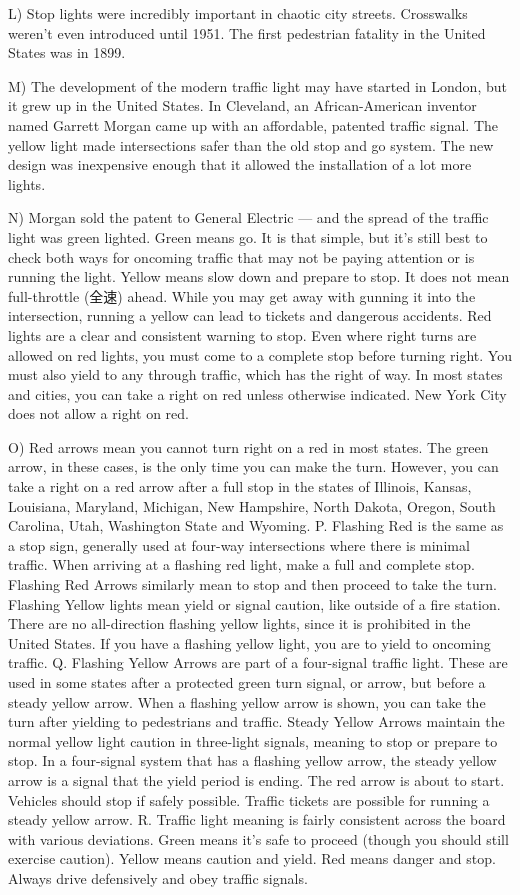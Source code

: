 \documentclass[UTF8,11pt]{ctexart}
\begin{document}
L) Stop lights were incredibly important in chaotic city streets. Crosswalks weren’t even introduced until 1951. The first pedestrian fatality in the United States was in 1899.


M) The development of the modern traffic light may have started in London, but it grew up in the United States. In Cleveland, an African-American inventor named Garrett Morgan came up with an affordable, patented traffic signal. The yellow light made intersections safer than the old stop and go system. The new design was inexpensive enough that it allowed the installation of a lot more lights.


N) Morgan sold the patent to General Electric — and the spread of the traffic light was green lighted. Green means go. It is that simple, but it’s still best to check both ways for oncoming traffic that may not be paying attention or is running the light. Yellow means slow down and prepare to stop. It does not mean full-throttle (全速) ahead. While you may get away with gunning it into the intersection, running a yellow can lead to tickets and dangerous accidents. Red lights are a clear and consistent warning to stop. Even where right turns are allowed on red lights, you must come to a complete stop before turning right. You must also yield to any through traffic, which has the right of way. In most states and cities, you can take a right on red unless otherwise indicated. New York City does not allow a right on red.


O) Red arrows mean you cannot turn right on a red in most states. The green arrow, in these cases, is the only time you can make the turn. However, you can take a right on a red arrow after a full stop in the states of Illinois, Kansas, Louisiana, Maryland, Michigan, New Hampshire, North Dakota, Oregon, South Carolina, Utah, Washington State and Wyoming. P. Flashing Red is the same as a stop sign, generally used at four-way intersections where there is minimal traffic. When arriving at a flashing red light, make a full and complete stop. Flashing Red Arrows similarly mean to stop and then proceed to take the turn. Flashing Yellow lights mean yield or signal caution, like outside of a fire station. There are no all-direction flashing yellow lights, since it is prohibited in the United States. If you have a flashing yellow light, you are to yield to oncoming traffic. Q. Flashing Yellow Arrows are part of a four-signal traffic light. These are used in some states after a protected green turn signal, or arrow, but before a steady yellow arrow. When a flashing yellow arrow is shown, you can take the turn after yielding to pedestrians and traffic. Steady Yellow Arrows maintain the normal yellow light caution in three-light signals, meaning to stop or prepare to stop. In a four-signal system that has a flashing yellow arrow, the steady yellow arrow is a signal that the yield period is ending. The red arrow is about to start. Vehicles should stop if safely possible. Traffic tickets are possible for running a steady yellow arrow. R. Traffic light meaning is fairly consistent across the board with various deviations. Green means it’s safe to proceed (though you should still exercise caution). Yellow means caution and yield. Red means danger and stop. Always drive defensively and obey traffic signals.
\end{document}
